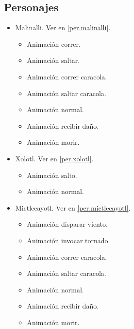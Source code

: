         \subsection{Personajes}
        \begin{itemize}
                \item Malinalli. Ver en \ref{per.malinalli}.
                \begin{itemize}
                        \item Animación correr.
                        \item Animación saltar.
                        \item Animación correr caracola.
                        \item Animación saltar caracola.
                        \item Animación normal.
                        \item Animación recibir daño.
						\item Animación morir.
                \end{itemize} 
                \item Xolotl. Ver en \ref{per.xolotl}.
                \begin{itemize}
					\item Animación salto.
					\item Animación normal.
				\end{itemize}
                \item Mictlecayotl. Ver en \ref{per.mictlecayotl}.
                \begin{itemize}
                        \item Animación disparar viento.
                        \item Animación invocar tornado.
                        \item Animación correr caracola.
                        \item Animación saltar caracola.
                        \item Animación normal.
                        \item Animación recibir daño.
						\item Animación morir.
                \end{itemize} 
        \end{itemize}
